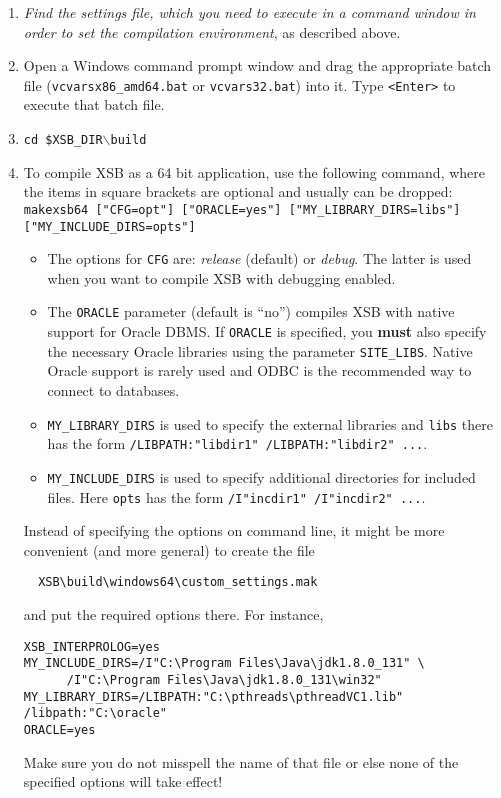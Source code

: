 \begin{enumerate}
\item \emph{Find the settings file, which you need to execute in a command
  window in order to set the compilation environment}, as described above.
\item
    Open a Windows command prompt window and
    drag the appropriate batch file (\texttt{vcvarsx86\_amd64.bat} or
    \texttt{vcvars32.bat}) into it. Type \texttt{<Enter>} to execute that
    batch file. 
\item
   {\tt cd \$XSB\_DIR$\backslash$build}  
\item
To compile XSB as a 64 bit application, use the following command, where the
items in square brackets are optional and usually can be dropped:\\
  {\small{\tt makexsb64\,["CFG=opt"]\,["ORACLE=yes"]\,["MY\_LIBRARY\_DIRS=libs"]\,["MY\_INCLUDE\_DIRS=opts"]}}
  \begin{itemize}
  \item The options for {\tt CFG} are: \emph{release} (default) or \emph{debug}.  The
    latter is used when you want to compile XSB with debugging enabled.
  \item The {\tt ORACLE} parameter (default is ``no'') compiles XSB with
    native support for Oracle DBMS. If {\tt ORACLE} is
    specified, you {\bf must} also specify the necessary Oracle libraries
    using the parameter {\tt SITE\_LIBS}.
    Native Oracle support is rarely used and ODBC is the recommended way to
    connect to databases.
  \item \texttt{MY\_LIBRARY\_DIRS} is used to specify the external
    libraries and \texttt{libs} there has the form  \texttt{/LIBPATH:"libdir1"
    /LIBPATH:"libdir2" ...}.  
  \item \texttt{MY\_INCLUDE\_DIRS} is used to specify additional
    directories for included files. Here \texttt{opts} has the form
    \texttt{/I"incdir1" /I"incdir2" ...}.  
  \end{itemize}
  Instead of specifying the options on command line,
  it might be more convenient (and more general) to create the file
\begin{verbatim}
  XSB\build\windows64\custom_settings.mak  
\end{verbatim}
  and put the required options there. For instance,
\begin{verbatim}
XSB_INTERPROLOG=yes 
MY_INCLUDE_DIRS=/I"C:\Program Files\Java\jdk1.8.0_131" \
      /I"C:\Program Files\Java\jdk1.8.0_131\win32" 
MY_LIBRARY_DIRS=/LIBPATH:"C:\pthreads\pthreadVC1.lib" /libpath:"C:\oracle"
ORACLE=yes
\end{verbatim}
Make sure you do not misspell the name of that file or else none of the
specified options will take effect!
   

\end{enumerate}
